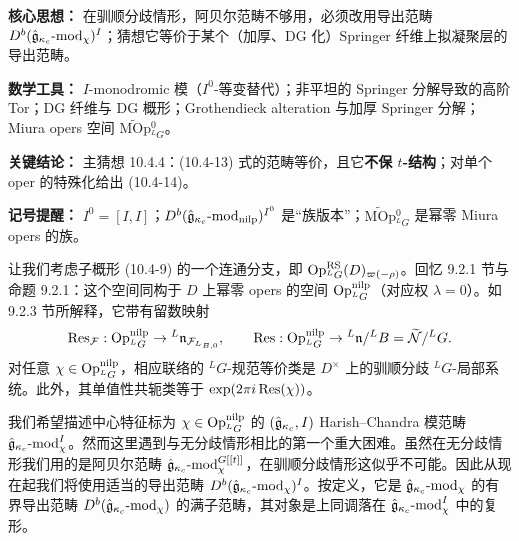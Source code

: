 \begin{keypoints}
    \item \textbf{核心思想：} 在驯顺分歧情形，阿贝尔范畴不够用，必须改用导出范畴 $D^b(\hat{\mathfrak{g}}_{\kappa_c}\text{-}\mathrm{mod}_\chi)^I$；猜想它等价于某个（加厚、DG 化）Springer 纤维上拟凝聚层的导出范畴。
    \item \textbf{数学工具：} $I$-monodromic 模（$I^0$-等变替代）；非平坦的 Springer 分解导致的高阶 Tor；DG 纤维与 DG 概形；Grothendieck alteration 与加厚 Springer 分解；Miura opers 空间 $\widetilde{\mathrm{MOp}}{}^0_{{}^L G}$。
    \item \textbf{关键结论：} 主猜想 10.4.4：(10.4-13) 式的范畴等价，且它\textbf{不保 $t$-结构}；对单个 oper 的特殊化给出 (10.4-14)。
    \item \textbf{记号提醒：} $I^0=[I,I]$；$D^b(\hat{\mathfrak{g}}_{\kappa_c}\text{-}\mathrm{mod}_{\mathrm{nilp}})^{I^0}$ 是“族版本”；$\widetilde{\mathrm{MOp}}{}^0_{{}^L G}$ 是幂零 Miura opers 的族。
\end{keypoints}

让我们考虑子概形 (10.4-9) 的一个连通分支，即 $\operatorname{Op}^{\mathrm{RS}}_{{}^L G}(D)_{\varpi(-\rho)}$。回忆 9.2.1 节与命题 9.2.1：这个空间同构于 $D$ 上幂零 opers 的空间 $\operatorname{Op}^{\mathrm{nilp}}_{{}^L G}$（对应权 $\lambda=0$）。如 9.2.3 节所解释，它带有留数映射
\[
    \operatorname{Res}_{\mathcal{F}}:\operatorname{Op}^{\mathrm{nilp}}_{{}^L G}\to{}^L\mathfrak{n}_{\mathcal{F}_{{}^L B,0}},
    \qquad
    \operatorname{Res}:\operatorname{Op}^{\mathrm{nilp}}_{{}^L G}\to{}^L\mathfrak{n}/{}^L B=\widetilde{\mathcal{N}}/{}^L G.
\]
对任意 $\chi\in\operatorname{Op}^{\mathrm{nilp}}_{{}^L G}$，相应联络的 ${}^L G$-规范等价类是 $D^\times$ 上的驯顺分歧 ${}^L G$-局部系统。此外，其单值性共轭类等于 $\exp(2\pi i\operatorname{Res}(\chi))$。

我们希望描述中心特征标为 $\chi\in\operatorname{Op}^{\mathrm{nilp}}_{{}^L G}$ 的 $(\hat{\mathfrak{g}}_{\kappa_c},I)$ Harish--Chandra 模范畴 $\hat{\mathfrak{g}}_{\kappa_c}\text{-}\mathrm{mod}_\chi^I$。然而这里遇到与无分歧情形相比的第一个重大困难。虽然在无分歧情形我们用的是阿贝尔范畴 $\hat{\mathfrak{g}}_{\kappa_c}\text{-}\mathrm{mod}_\chi^{G[[t]]}$，在驯顺分歧情形这似乎不可能。因此从现在起我们将使用适当的导出范畴 $D^b(\hat{\mathfrak{g}}_{\kappa_c}\text{-}\mathrm{mod}_\chi)^I$。按定义，它是 $\hat{\mathfrak{g}}_{\kappa_c}\text{-}\mathrm{mod}_\chi$ 的有界导出范畴 $D^b(\hat{\mathfrak{g}}_{\kappa_c}\text{-}\mathrm{mod}_\chi)$ 的满子范畴，其对象是上同调落在 $\hat{\mathfrak{g}}_{\kappa_c}\text{-}\mathrm{mod}_\chi^I$ 中的复形。


